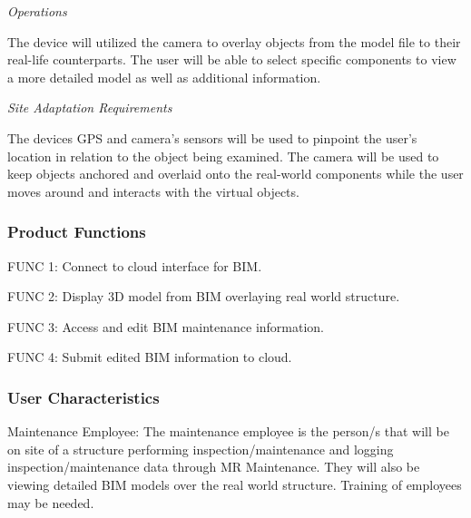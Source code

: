 \documentclass[onecolumn, draftclsnofoot,10pt, compsoc]{IEEEtran}
\begin{document}
            \textit{Operations}\par
            \hangindent=10mm\noindent The device will utilized the camera to overlay objects from the model file to their real-life counterparts. The user will be able to select specific components to view a more detailed model as well as additional information. \par
            \textit{Site Adaptation Requirements}\par
            \hangindent=10mm\noindent The devices GPS and camera's sensors will be used to pinpoint the user's location in relation to the object being examined. The camera will be used to keep objects anchored and overlaid onto the real-world components while the user moves around and interacts with the virtual objects. \par

            \subsubsection{Product Functions}
                   \hspace{10mm}FUNC 1: \hspace{10mm}Connect to cloud interface for BIM.\par
                   \hspace{10mm}FUNC 2: \hspace{10mm}Display 3D model from BIM overlaying real world structure.\par
                   \hspace{10mm}FUNC 3: \hspace{10mm}Access and edit BIM maintenance information.\par
                   \hspace{10mm}FUNC 4: \hspace{10mm}Submit edited BIM information to cloud.\par

            \subsubsection{User Characteristics}
               \hangindent=10mm\noindent Maintenance Employee: The maintenance employee is the person/s that will be on site of a structure performing inspection/maintenance and logging inspection/maintenance data through MR Maintenance. They will also be viewing detailed BIM models over the real world structure. Training of employees may be needed.\par
\end{document}
